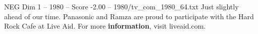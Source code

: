 \begin{textsample}{NEG Dim 1 – 1980 – Score -2.00 – 1980/tv\_com\_1980\_64.txt}  \label{ex:f1_neg_052}
Just slightly ahead of our time.
Panasonic and Ramza are proud to participate with the Hard Rock Cafe at Live Aid.
For more \textbf{information}, visit liveaid.com.

\end{textsample}

